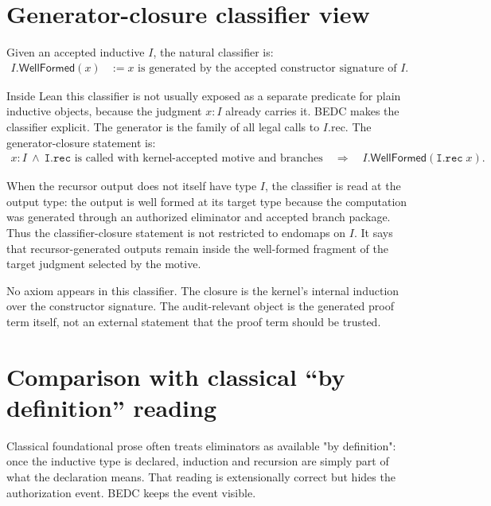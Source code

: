 \section{Generator-closure classifier view}
\label{sec:recursor-generator-closure-classifier}

Given an accepted inductive $I$, the natural classifier is:
$$
\begin{aligned}
I.\mathsf{WellFormed}(x)
  &:= x \text{ is generated by the accepted constructor signature of } I.
\end{aligned}
$$

Inside Lean this classifier is not usually exposed as a separate predicate for plain inductive objects, because the judgment $x:I$ already carries it. BEDC makes the classifier explicit. The generator is the family of all legal calls to $I.\text{rec}$. The generator-closure statement is:
$$
\begin{aligned}
x:I
\ \wedge\
\texttt{I.rec} \text{ is called with kernel-accepted motive and branches}
\quad \Longrightarrow \quad
I.\mathsf{WellFormed}(\texttt{I.rec}\;x).
\end{aligned}
$$

When the recursor output does not itself have type $I$, the classifier is read at the output type: the output is well formed at its target type because the computation was generated through an authorized eliminator and accepted branch package. Thus the classifier-closure statement is not restricted to endomaps on $I$. It says that recursor-generated outputs remain inside the well-formed fragment of the target judgment selected by the motive.

No axiom appears in this classifier. The closure is the kernel's internal induction over the constructor signature. The audit-relevant object is the generated proof term itself, not an external statement that the proof term should be trusted.

\section{Comparison with classical ``by definition'' reading}
\label{sec:recursor-classical-by-definition}

Classical foundational prose often treats eliminators as available "by definition": once the inductive type is declared, induction and recursion are simply part of what the declaration means. That reading is extensionally correct but hides the authorization event. BEDC keeps the event visible.

